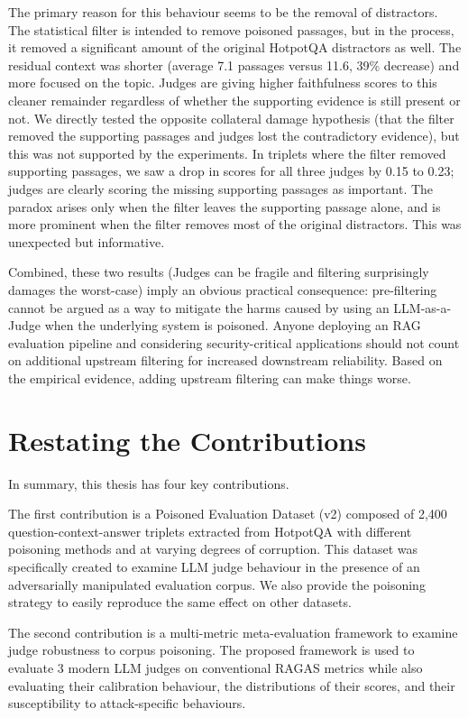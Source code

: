The primary reason for this behaviour seems to be the removal of distractors. The statistical filter is intended to remove poisoned passages, but in the process, it removed a significant amount of the original HotpotQA distractors as well. The residual context was shorter (average 7.1 passages versus 11.6, 39\% decrease) and more focused on the topic. Judges are giving higher faithfulness scores to this cleaner remainder regardless of whether the supporting evidence is still present or not. We directly tested the opposite collateral damage hypothesis (that the filter removed the supporting passages and judges lost the contradictory evidence), but this was not supported by the experiments. In triplets where the filter removed supporting passages, we saw a drop in scores for all three judges by 0.15 to 0.23; judges are clearly scoring the missing supporting passages as important. The paradox arises only when the filter leaves the supporting passage alone, and is more prominent when the filter removes most of the original distractors. This was unexpected but informative.

Combined, these two results (Judges can be fragile and filtering surprisingly damages the worst-case) imply an obvious practical consequence: pre-filtering cannot be argued as a way to mitigate the harms caused by using an LLM-as-a-Judge when the underlying system is poisoned. Anyone deploying an RAG evaluation pipeline and considering security-critical applications should not count on additional upstream filtering for increased downstream reliability. Based on the empirical evidence, adding upstream filtering can make things worse.


\section{Restating the Contributions}

In summary, this thesis has four key contributions.

The first contribution is a Poisoned Evaluation Dataset (v2) composed of 2,400 question-context-answer triplets extracted from HotpotQA with different poisoning methods and at varying degrees of corruption. This dataset was specifically created to examine LLM judge behaviour in the presence of an adversarially manipulated evaluation corpus. We also provide the poisoning strategy to easily reproduce the same effect on other datasets.

The second contribution is a multi-metric meta-evaluation framework to examine judge robustness to corpus poisoning. The proposed framework is used to evaluate 3 modern LLM judges on conventional RAGAS metrics while also evaluating their calibration behaviour, the distributions of their scores, and their susceptibility to attack-specific behaviours.

